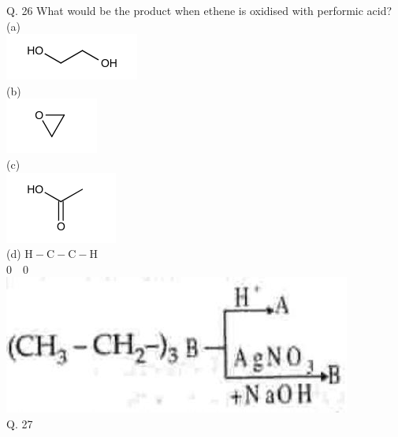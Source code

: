 \documentclass[10pt]{article}
\begin{document}
Q. 26 What would be the product when ethene is oxidised with performic acid?\\
(a)\\
\includegraphics{smile-d72235b44e54cd127ed991dceff3821128855d32}\\
(b)\\
\includegraphics{smile-a46803eb580898c1e9ada50a6ed37033b8db412a}\\
(c)\\
\includegraphics{smile-62077941eb73ebebf6f6e1009d7479376a716609}\\
(d) $\mathrm{H}-\mathrm{C}-\mathrm{C}-\mathrm{H}$\\
$0 \quad 0$\\
\includegraphics[max width=\textwidth, center]{2025_01_28_8470952b98110cec3aabg-231}\\
Q. 27
\end{document}
